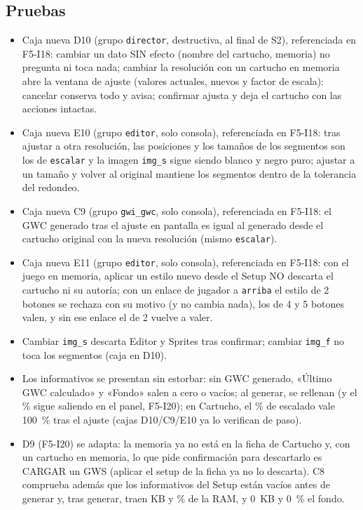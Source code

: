 \subsection{Pruebas}
\label{sec:F5I21Pruebas}

\begin{itemize}
	\item Caja nueva D10 (grupo \texttt{director}, destructiva, al final de S2), referenciada en F5-I18: cambiar un dato SIN efecto (nombre del cartucho, memoria) no pregunta ni toca nada; cambiar la resolución con un cartucho en memoria abre la ventana de ajuste (valores actuales, nuevos y factor de escala): cancelar conserva todo y avisa; confirmar ajusta y deja el cartucho con las acciones intactas.
	\item Caja nueva E10 (grupo \texttt{editor}, solo consola), referenciada en F5-I18: tras ajustar a otra resolución, las posiciones y los tamaños de los segmentos son los de \texttt{escalar} y la imagen \texttt{img\_s} sigue siendo blanco y negro puro; ajustar a un tamaño y volver al original mantiene los segmentos dentro de la tolerancia del redondeo.
	\item Caja nueva C9 (grupo \texttt{gwi\_gwc}, solo consola), referenciada en F5-I18: el GWC generado tras el ajuste en pantalla es igual al generado desde el cartucho original con la nueva resolución (mismo \texttt{escalar}).
	\item Caja nueva E11 (grupo \texttt{editor}, solo consola), referenciada en F5-I18: con el juego en memoria, aplicar un estilo nuevo desde el Setup NO descarta el cartucho ni su autoría; con un enlace de jugador a \texttt{arriba} el estilo de 2 botones se rechaza con su motivo (y no cambia nada), los de 4 y 5 botones valen, y sin ese enlace el de 2 vuelve a valer.
	\item Cambiar \texttt{img\_s} descarta Editor y Sprites tras confirmar; cambiar \texttt{img\_f} no toca los segmentos (caja en D10).
	\item Los informativos se presentan sin estorbar: sin GWC generado, «Último GWC calculado» y «Fondo» salen a cero o vacíos; al generar, se rellenan (y el \% sigue saliendo en el panel, F5-I20); en Cartucho, el \% de escalado vale 100~\% tras el ajuste (cajas D10/C9/E10 ya lo verifican de paso).
	\item D9 (F5-I20) se adapta: la memoria ya no está en la ficha de Cartucho y, con un cartucho en memoria, lo que pide confirmación para descartarlo es CARGAR un GWS (aplicar el setup de la ficha ya no lo descarta). C8 comprueba además que los informativos del Setup están vacíos antes de generar y, tras generar, traen KB y \% de la RAM, y 0~KB y 0~\% el fondo.

\end{itemize}
